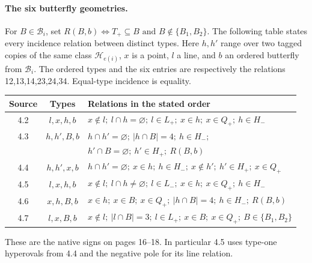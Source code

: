 \documentclass[11pt]{article}
\newcommand{\orb}{\mathcal B}\newcommand{\hyp}{\mathcal H}
\begin{document}
\paragraph{The six butterfly geometries.}
For $B\in\orb_i$, set
$R(B,b)\iff T_+\subseteq B\text{ and }B\notin\{B_1,B_2\}$.
The following table states every incidence relation between distinct types.
Here $h,h'$ range over two tagged copies of the same class
$\hyp_{e(i)}$, $x$ is a point, $l$ a line, and $b$ an ordered butterfly
from $\orb_i$. The ordered types and the six entries are respectively the
relations 12,13,14,23,24,34. Equal-type incidence is equality.
\begin{center}\small
\renewcommand{\arraystretch}{1.25}
\begin{tabular}{ccl}
\toprule Source&Types&Relations in the stated order\\\midrule
4.2&$l,x,h,b$&$x\notin l;\ l\cap h=\varnothing;\ l\in L_+;\ x\in h;\ x\in Q_+;\ h\in H_-$\\
4.3&$h,h',B,b$&$h\cap h'=\varnothing;\ |h\cap B|=4;\ h\in H_-;$\\
&&$h'\cap B=\varnothing;\ h'\in H_+;\ R(B,b)$\\
4.4&$h,h',x,b$&$h\cap h'=\varnothing;\ x\in h;\ h\in H_-;\ x\notin h';\ h'\in H_+;\ x\in Q_+$\\
4.5&$l,x,h,b$&$x\notin l;\ l\cap h\ne\varnothing;\ l\in L_-;\ x\in h;\ x\in Q_+;\ h\in H_-$\\
4.6&$x,h,B,b$&$x\in h;\ x\in B;\ x\in Q_+;\ |h\cap B|=4;\ h\in H_-;\ R(B,b)$\\
4.7&$l,x,B,b$&$x\notin l;\ |l\cap B|=3;\ l\in L_+;\ x\in B;\ x\in Q_+;\ B\in\{B_1,B_2\}$\\
\bottomrule
\end{tabular}\end{center}
These are the native signs on pages 16--18. In particular 4.5 uses type-one
hyperovals from 4.4 and the negative pole for its line relation.
\end{document}
